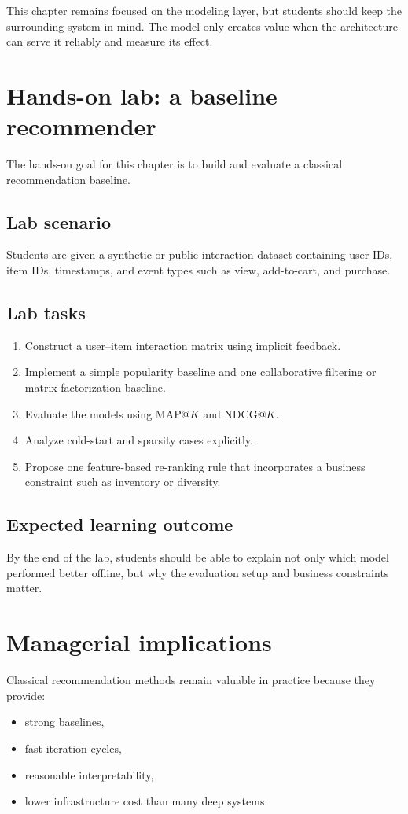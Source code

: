 This chapter remains focused on the modeling layer, but students should keep the surrounding system in mind.
The model only creates value when the architecture can serve it reliably and measure its effect.

\section{Hands-on lab: a baseline recommender}
The hands-on goal for this chapter is to build and evaluate a classical recommendation baseline.

\subsection{Lab scenario}
Students are given a synthetic or public interaction dataset containing user IDs, item IDs, timestamps, and event types such as view, add-to-cart, and purchase.

\subsection{Lab tasks}
\begin{enumerate}
  \item Construct a user--item interaction matrix using implicit feedback.
  \item Implement a simple popularity baseline and one collaborative filtering or matrix-factorization baseline.
  \item Evaluate the models using MAP@$K$ and NDCG@$K$.
  \item Analyze cold-start and sparsity cases explicitly.
  \item Propose one feature-based re-ranking rule that incorporates a business constraint such as inventory or diversity.
\end{enumerate}

\subsection{Expected learning outcome}
By the end of the lab, students should be able to explain not only which model performed better offline, but why the evaluation setup and business constraints matter.

\section{Managerial implications}
Classical recommendation methods remain valuable in practice because they provide:
\begin{itemize}
  \item strong baselines,
  \item fast iteration cycles,
  \item reasonable interpretability,
  \item lower infrastructure cost than many deep systems.
\end{itemize}

